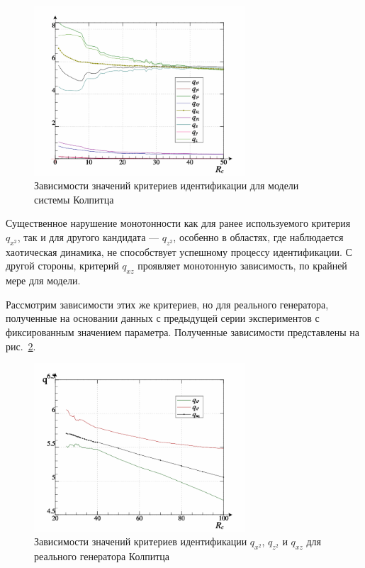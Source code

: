 \begin{figure}[htb!]
\centerline{\includegraphics[width=0.7\textwidth]{p/colp_bjt_q-p_Rc_q.png} }
\caption{Зависимости значений критериев идентификации для модели системы Колпитца}
\label{atu:f:colp_bjt_q-p_Rc_q}
\end{figure}

Существенное нарушение монотонности как для ранее используемого
критерия $q_{x^2}$, так и для другого кандидата --- $q_{z^2}$,
особенно в областях, где наблюдается хаотическая динамика,
не способствует успешному процессу идентификации.
С другой стороны, критерий $q_{xz}$ проявляет
монотонную зависимость, по крайней мере для модели.

Рассмотрим зависимости этих же критериев, но для
реального генератора, полученные на основании данных
с предыдущей серии экспериментов с фиксированным значением
параметра. Полученные зависимости представлены на рис.~\ref{atu:f:colp_read_q-p_Rc_q-p_Rc_q}.


\begin{figure}[htb!]
\centerline{\includegraphics[width=0.7\textwidth]{p/colp_read_q-p_Rc_q.png} }
  \caption{Зависимости значений критериев идентификации $q_{x^2}$, $q_{z^2}$ и $q_{xz}$ для реального генератора Колпитца}
\label{atu:f:colp_read_q-p_Rc_q-p_Rc_q}
\end{figure}

